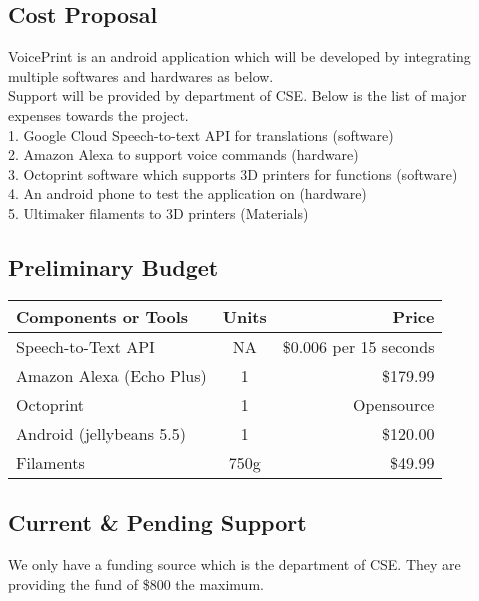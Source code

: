 \subsection{Cost Proposal}
VoicePrint is an android application which will be developed by integrating multiple softwares and hardwares as below.
\\
Support will be provided by department of CSE. Below is the list of major expenses towards the project.
\\
1. Google Cloud Speech-to-text API for translations (software)
\\
2. Amazon Alexa to support voice commands (hardware)
\\
3. Octoprint software which supports 3D printers for functions (software)
\\
4. An android phone to test the application on (hardware)
\\
5. Ultimaker filaments to 3D printers (Materials)

\subsection{Preliminary Budget}
\begin{tabular}{|l|c|r|}
	\hline
    Components or Tools & Units & Price\\
    \hline
    \hline
	Speech-to-Text API & NA & \$0.006 per 15 seconds\\
	\hline
	Amazon Alexa (Echo Plus) & 1 & \$179.99\\
	\hline
	Octoprint & 1 & Opensource\\
	\hline
	Android (jellybeans 5.5) & 1 & \$120.00\\
	\hline
	Filaments & 750g & \$49.99\\
	\hline
\end{tabular}

\subsection{Current \& Pending Support}
We only have a funding source which is the department of CSE. They are providing the fund of \$800 the maximum. \\